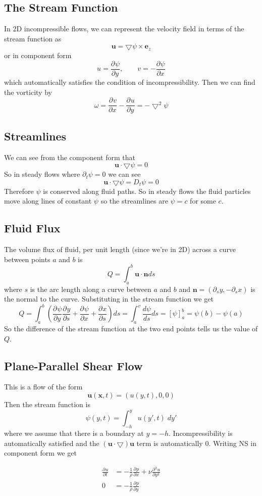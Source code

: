\documentclass[11pt]{article}
\newcommand*{\pd}[3][]{\ensuremath{\frac{\partial^{#1} {#2}}{\partial {#3}^{#1}}}}
\newcommand{\grad}{\bigtriangledown}
\newcommand{\mv}[1]{\bm{#1}}
\newcommand{\mdf}[1]{{\color{red}#1}}
\begin{document}
\subsection{The Stream Function}
In 2D incompressible flows, we can represent the velocity field in terms of the \mdf{stream function} as
\[
	\mv{u}=\grad\psi \times \mv{e}_z
\]
or in component form
\[
	u=\pd{\psi}{y}, \quad \quad v = - \pd{\psi}{x}
\]
which automatically satisfies the condition of incompressibility.
Then we can find the vorticity by
\[
	\omega = \pd{v}{x} - \pd{u}{y} = - \grad^2 \psi
\]

\subsection{Streamlines}
We can see from the component form that
\[
	\mv{u}\cdot \grad \psi = 0
\]
So in steady flows where $\partial_t\psi =0$ we can see
\[
	\mv{u}\cdot\grad\psi=D_t\psi = 0
\]
Therefore $\psi$ is conserved along fluid paths.
So in steady flows the fluid particles move along lines of constant $\psi$ so the streamlines are $\psi=c$ for some $c$.

\subsection{Fluid Flux}
The \mdf{volume flux of fluid}, per unit length (since we're in 2D) across a curve between points $a$ and $b$ is
\[
	Q = \int_a^b \mv{u}\cdot\mv{n} ds
\]
where $s$ is the arc length along a curve between $a$ and $b$ and $\mv{n}=(\partial_s y, -\partial_s x)$ is the normal to the curve.
Substituting in the stream function we get
\[
	Q = \int_a^b \left( \pd{\psi}{y}\pd{y}{s} + \pd{\psi}{x}+ \pd{x}{s}\right)ds = \int_a^v \frac{d\psi}{ds}ds = [\psi]_a^b = \psi(b) - \psi(a)
\]
So the difference of the stream function at the two end points tells us the value of $Q$.

\subsection{Plane-Parallel Shear Flow}
This is a flow of the form
\[
	\mv{u}(\mv{x}, t) = ( u(y, t), 0, 0)
\]
Then the stream function is
\[
	\psi(y, t) = \int_{-h}^y u(y' , t) \;dy'
\]
where we assume that there is a boundary at $y=-h$.
Incompressibility is automatically satisfied and the $(\mv{u}\cdot\grad)\mv{u}$ term is automatically $0$.
Writing NS in component form we get

\begin{align*}
	\pd{u}{t}&= - \frac{1}{\rho}\pd{p}{x} + \nu \pd{^2 u}{y^2} \\
	0 &= -\frac{1}{\rho}\pd{p}{y}
\end{align*}
\end{document}
